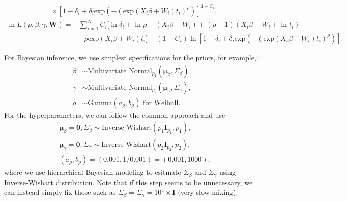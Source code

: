 \documentclass[a4paper, 12pt]{article}
\newcommand {\dsum}{\displaystyle \sum}
\begin{document}
\begin{itemize}
\begin{equation}
\begin{aligned}
	&\times [1-\delta _{i}+\delta_i \mbox{exp}(-(\mbox{exp}(X_i{\beta}+W_i)t_i)^{\rho})]^{1-C_{i}},
	\end{aligned}
	\end{equation}
	\begin{equation}
	\begin{aligned}
	\ln L(\rho, {\beta}, {\gamma}, \mathbf{W})=&\dsum\limits_{i=1}^{N}C_i [\ln\delta _{i}+ \ln\rho+(X_i{\beta}+ W_i) + (\rho-1)(X_i{\beta}+ W_i+ \ln t_i)\\&- \rho\mbox{exp}(X_i{\beta}+ W_i)t_i]+(1-C_i)\ln[1-\delta _{i}+\delta_i \mbox{exp}(-(\mbox{exp}(X_i{\beta}+W_i)t_i)^{\rho})].		
	\end{aligned}
	\end{equation}
\end{itemize}
For Bayesian inference, we use simplest specifications for the priors, for example,:
\begin{equation}
\begin{aligned}
{\beta} &\sim \mbox{Multivariate Normal}_{p_1}(\mathbf{\mu}_{\beta}, \Sigma_{\beta}),\\
{\gamma} &\sim \mbox{Multivariate Normal}_{p_2}(\mathbf{\mu}_{\gamma}, \Sigma_{\gamma}),\\
\rho&\sim \mbox{Gamma}(a_{\rho}, b_{\rho}) \mbox{ for Weibull}.
\end{aligned}
\end{equation}
For the hyperparameters, we can follow the common approach and use
\begin{equation}
\begin{aligned}
&\mathbf{\mu}_{\beta} = \mathbf{0}, \Sigma_{\beta} \sim \mbox{Inverse-Wishart}(p_1\mathbf{I}_{p_1}, p_1),\\
& \mathbf{\mu}_{\gamma} = \mathbf{0}, \Sigma_{\gamma} \sim \mbox{Inverse-Wishart}(p_2\mathbf{I}_{p_2}, p_2), \\
& (a_{\rho}, b_{\rho}) = (0.001, 1/0.001)= (0.001, 1000),
\end{aligned}
\end{equation}
where we use hierarchical Bayesian modeling to esitmate $\Sigma_{\beta}$ and $\Sigma_{\gamma}$ using Inverse-Wishart distribution. Note that if this step seems to be unnecessary, we can instead simply fix those such as $\Sigma_{\beta} =\Sigma_{\gamma} = 10^4\times\mathbf{I}$ (very slow mixing). 
\end{document}
